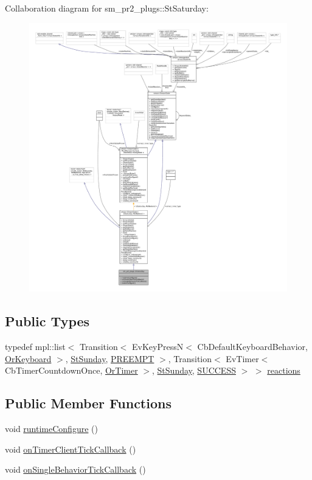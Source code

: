 Collaboration diagram for sm\+\_\+pr2\+\_\+plugs\+:\+:St\+Saturday\+:
\nopagebreak
\begin{figure}[H]
\begin{center}
\leavevmode
\includegraphics[width=350pt]{structsm__pr2__plugs_1_1StSaturday__coll__graph}
\end{center}
\end{figure}
\subsection*{Public Types}
\begin{DoxyCompactItemize}
\item 
typedef mpl\+::list$<$ Transition$<$ Ev\+Key\+PressN$<$ Cb\+Default\+Keyboard\+Behavior, \hyperlink{classsm__pr2__plugs_1_1OrKeyboard}{Or\+Keyboard} $>$, \hyperlink{structsm__pr2__plugs_1_1StSunday}{St\+Sunday}, \hyperlink{classPREEMPT}{P\+R\+E\+E\+M\+PT} $>$, Transition$<$ Ev\+Timer$<$ Cb\+Timer\+Countdown\+Once, \hyperlink{classsm__pr2__plugs_1_1OrTimer}{Or\+Timer} $>$, \hyperlink{structsm__pr2__plugs_1_1StSunday}{St\+Sunday}, \hyperlink{classSUCCESS}{S\+U\+C\+C\+E\+SS} $>$ $>$ \hyperlink{structsm__pr2__plugs_1_1StSaturday_aedc30deb3614a9cc930b62838e5377d7}{reactions}
\end{DoxyCompactItemize}
\subsection*{Public Member Functions}
\begin{DoxyCompactItemize}
\item 
void \hyperlink{structsm__pr2__plugs_1_1StSaturday_a126e8e77d8ffdb486a03e800e61b1bfd}{runtime\+Configure} ()
\item 
void \hyperlink{structsm__pr2__plugs_1_1StSaturday_a5a4307c8e54a5179cda1e5234e8845f6}{on\+Timer\+Client\+Tick\+Callback} ()
\item 
void \hyperlink{structsm__pr2__plugs_1_1StSaturday_a47a5704234cb627ab15b577b0d08060a}{on\+Single\+Behavior\+Tick\+Callback} ()
\end{DoxyCompactItemize}
